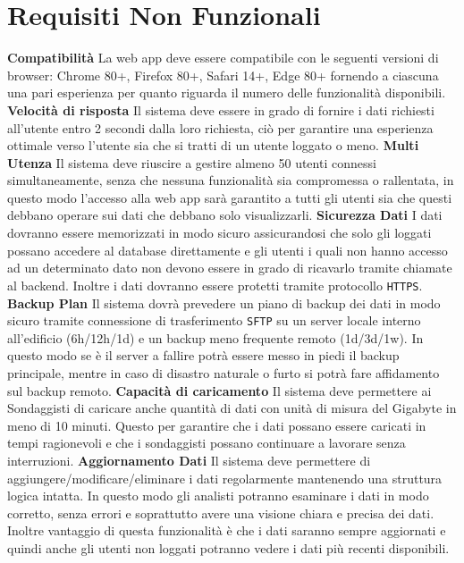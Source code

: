 \chapter{Requisiti Non Funzionali} 
    \begin{rnfList}
        \rnfItem \textbf{Compatibilità} La web app deve essere compatibile con le seguenti versioni di browser: Chrome 80+, Firefox 80+, Safari 14+, Edge 80+ fornendo a ciascuna una pari esperienza per quanto riguarda il numero delle funzionalità disponibili.
        \rnfItem \textbf{Velocità di risposta} Il sistema deve essere in grado di fornire i dati richiesti all’utente entro 2 secondi dalla loro richiesta, ciò per garantire una esperienza ottimale verso l’utente sia che si tratti di un utente loggato o meno.
        \rnfItem \textbf{Multi Utenza} Il sistema deve riuscire a gestire almeno 50 utenti connessi simultaneamente, senza che nessuna funzionalità sia compromessa o rallentata, in questo modo l'accesso alla web app sarà garantito a tutti gli utenti sia che questi debbano operare sui dati che debbano solo visualizzarli.
        \rnfItem \textbf{Sicurezza Dati} I dati dovranno essere memorizzati in modo sicuro assicurandosi che solo gli loggati possano accedere al database direttamente e gli utenti i quali non hanno accesso ad un determinato dato non devono essere in grado di ricavarlo tramite chiamate al backend. Inoltre i dati dovranno essere protetti tramite protocollo \texttt{HTTPS}.
        \rnfItem \textbf{Backup Plan} Il sistema dovrà prevedere un piano di backup dei dati in modo sicuro tramite connessione di trasferimento \texttt{SFTP} su un server locale interno all'edificio (6h/12h/1d) e un backup meno frequente remoto (1d/3d/1w). In questo modo se è il server a fallire potrà essere messo in piedi il backup principale, mentre in caso di disastro naturale o furto si potrà fare affidamento sul backup remoto.
        \rnfItem \textbf{Capacità di caricamento} Il sistema deve permettere ai Sondaggisti di caricare anche quantità di dati con unità di misura del Gigabyte in meno di 10 minuti. Questo per garantire che i dati possano essere caricati in tempi ragionevoli e che i sondaggisti possano continuare a lavorare senza interruzioni.
        \rnfItem \textbf{Aggiornamento Dati} Il sistema deve permettere di aggiungere/modificare/eliminare i dati regolarmente mantenendo una struttura logica intatta. In questo modo gli analisti potranno esaminare i dati in modo corretto, senza errori e soprattutto avere una visione chiara e precisa dei dati. Inoltre vantaggio di questa funzionalità è che i dati saranno sempre aggiornati e quindi anche gli utenti non loggati potranno vedere i dati più recenti disponibili.

\end{rnfList}
